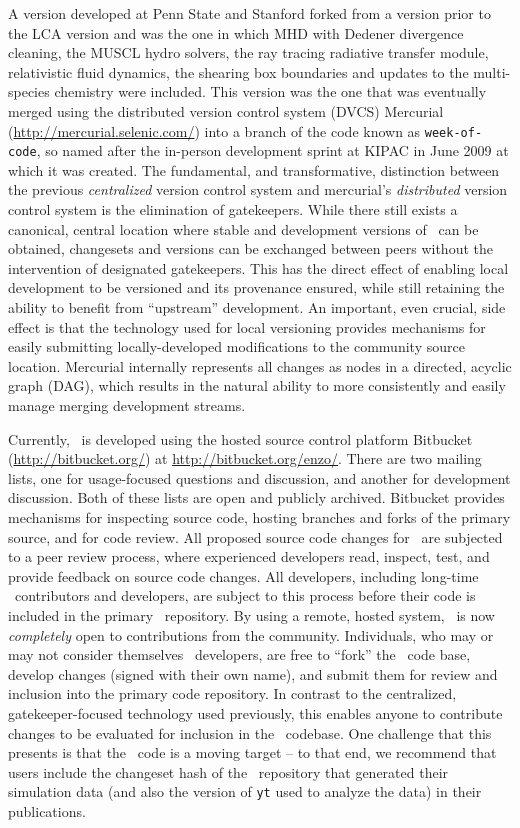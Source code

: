 A version developed at Penn State and Stanford forked from a version
prior to the LCA version and was the one in which MHD with Dedener
divergence cleaning, the MUSCL hydro solvers, the ray tracing
radiative transfer module, relativistic fluid dynamics, the shearing
box boundaries and updates to the multi-species chemistry were
included. This version was the one that was eventually merged using
the distributed version control system (DVCS) Mercurial
(\url{http://mercurial.selenic.com/}) into a branch of the code known
as \texttt{week-of-code}, so named after the in-person development
sprint at KIPAC in June 2009 at which it was created.  The
fundamental, and transformative, distinction between the previous
\textit{centralized} version control system and mercurial's
\textit{distributed} version control system is the elimination of
gatekeepers.  While there still exists a canonical, central location
where stable and development versions of \enzo\ can be obtained,
changesets and versions can be exchanged between peers without the
intervention of designated gatekeepers.  This has the direct effect of
enabling local development to be versioned and its provenance ensured,
while still retaining the ability to benefit from ``upstream''
development.  An important, even crucial, side effect is that the
technology used for local versioning provides mechanisms for easily
submitting locally-developed modifications to the community source
location.  Mercurial internally represents all changes as nodes in a
directed, acyclic graph (DAG), which results in the natural ability to
more consistently and easily manage merging development streams.

Currently, \enzo\ is developed using the hosted source control
platform Bitbucket (\url{http://bitbucket.org/}) at
\url{http://bitbucket.org/enzo/}.  There are two mailing lists, one
for usage-focused questions and discussion, and another for
development discussion.  Both of these lists are open and publicly
archived.  Bitbucket provides mechanisms for inspecting source code,
hosting branches and forks of the primary source, and for code review.
All proposed source code changes for \enzo\ are subjected to a peer
review process, where experienced developers read, inspect, test, and
provide feedback on source code changes.  All developers, including
long-time \enzo\ contributors and developers, are subject to this
process before their code is included in the primary \enzo\
repository.  By using a remote, hosted system, \enzo\ is now
\textit{completely} open to contributions from the community.
Individuals, who may or may not consider themselves \enzo\ developers,
are free to ``fork'' the \enzo\ code base, develop changes (signed
with their own name), and submit them for review and inclusion into
the primary code repository.  In
contrast to the centralized, gatekeeper-focused technology used
previously, this enables anyone to contribute changes to be evaluated
for inclusion in the \enzo\ codebase.  One challenge that this
presents is that the \enzo\ code is a moving target -- to that end, we
recommend that users include the changeset hash of the \enzo\
repository that generated their simulation data (and also the version
of \texttt{yt} used to analyze the data) in their publications.

